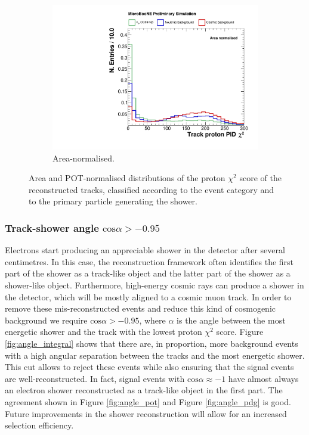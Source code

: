 \begin{figure}[htbp]
\begin{subfigure}{0.49\textwidth}
    \includegraphics[width=\linewidth]{figures/h_track_pidchipr_norm.pdf}
    \caption{Area-normalised.} \label{fig:proton_norm}
  \end{subfigure}
  \caption{Area and POT-normalised distributions of the proton $\chi^2$ score of the reconstructed tracks, classified according to the event category and to the primary particle generating the shower.}\label{fig:proton_bkg}
\end{figure}

\subsubsection*{Track-shower angle $\mathrm{cos}\alpha > -0.95$}
Electrons start producing an appreciable shower in the detector after several centimetres. In this case, the reconstruction framework often identifies the first part of the shower as a track-like object and the latter part of the shower as a shower-like object. 
Furthermore, high-energy cosmic rays can produce a shower in the detector, which will be mostly aligned to a cosmic muon track. In order to remove these mis-reconstructed events and reduce this kind of cosmogenic background we require $\mathrm{cos}\alpha > -0.95$, where $\alpha$ is the angle between the most energetic shower and the track with the lowest proton $\chi^2$ score.
Figure \ref{fig:angle_integral} shows that there are, in proportion, more background events with a high angular separation between the tracks and the most energetic shower. This cut allows to reject these events while also ensuring that the signal events are well-reconstructed. In fact, signal events with $\mathrm{cos}\alpha \approx -1$ have almost always an electron shower reconstructed as a track-like object in the first part. The agreement shown in Figure \ref{fig:angle_pot} and Figure \ref{fig:angle_pdg} is good. Future improvements in the shower reconstruction will allow for an increased selection efficiency.

